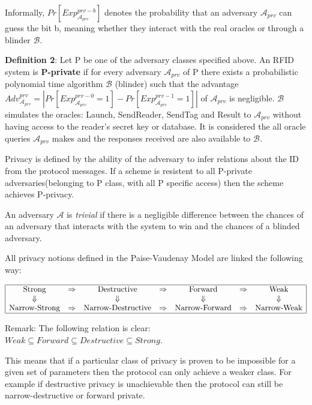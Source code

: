     Informally, $Pr[Exp_{\mathcal{A}_{prv}}^{prv-b}]$ denotes the probability that an adversary $\mathcal{A}_{prv}$
    can guess the bit b, meaning whether they interact with the real oracles or through a blinder $\mathcal{B}$.

    \textbf{Definition 2}: Let P be one of the adversary classes specified above. An RFID system is \textbf{P-private} if for
    every adversary $\mathcal{A}_{prv}$ of P there exists a probabilistic polynomial time algorithm $\mathcal{B}$ 
    (blinder) such that the advantage $Adv_{\mathcal{A}_{prv}}^{prv} = | Pr[Exp_{\mathcal{A}_{prv}}^{prv-0} = 1] - Pr[Exp_{\mathcal{A}_{prv}}^{prv-1} = 1] |$ 
    of $\mathcal{A}_{prv}$ is negligible. $\mathcal{B}$ simulates the oracles: Launch, SendReader, SendTag and
    Result to $\mathcal{A}_{prv}$ without having access to the reader's secret key or database. It is considered the all
    oracle queries $\mathcal{A}_{prv}$ makes and the responses received are also available to $\mathcal{B}$.

    Privacy is defined by the ability of the adversary to infer relations about the ID from the protocol
    messages. If a scheme is resistent to all P-private adversaries(belonging to P class, with all
    P specific access) then the scheme achieves P-privacy.

    An adversary $\mathcal{A}$ is \textit{trivial} if there is a negligible difference between the chances
    of an adversary that interacts with the system to win and the chances of a blinded adversary.

    All privacy notions defined in the Paise-Vaudenay Model are linked the following way:

    \[
    \begin{array}{|ccccccc|}
        \hline
        \text{Strong} & \Rightarrow & \text{Destructive} & \Rightarrow & \text{Forward} & \Rightarrow & \text{Weak} \\
        \Downarrow & &  \Downarrow  & &\Downarrow  & & \Downarrow \\
        \text{Narrow-Strong} & \Rightarrow & \text{Narrow-Destructive} & \Rightarrow & \text{Narrow-Forward} & \Rightarrow & \text{Narrow-Weak} \\
        \hline
    \end{array}
    \]

    Remark: The following relation is clear: $Weak \subseteq Forward \subseteq Destructive \subseteq Strong$.

    This means that if a particular class of privacy is proven to be impossible for a given set of parameters then the protocol can only 
    achieve a weaker class. For example if destructive privacy is unachievable then the protocol can still be narrow-destructive or 
    forward private.
